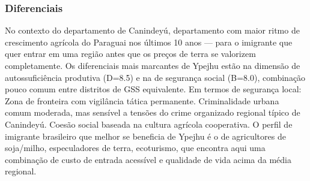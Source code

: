 \subsubsection*{Diferenciais}\label{dif-ypejhu-1406}
No contexto do departamento de Canindeyú, departamento com maior ritmo de crescimento agrícola do Paraguai nos últimos 10 anos — para o imigrante que quer entrar em uma região antes que os preços de terra se valorizem completamente. Os diferenciais mais marcantes de Ypejhu estão na dimensão de autossuficiência produtiva (D=8.5) e na de segurança social (B=8.0), combinação pouco comum entre distritos de GSS equivalente. Em termos de segurança local: Zona de fronteira com vigilância tática permanente. Criminalidade urbana comum moderada, mas sensível a tensões do crime organizado regional típico de Canindeyú. Coesão social baseada na cultura agrícola cooperativa. O perfil de imigrante brasileiro que melhor se beneficia de Ypejhu é o de agricultores de soja/milho, especuladores de terra, ecoturismo, que encontra aqui uma combinação de custo de entrada acessível e qualidade de vida acima da média regional.
